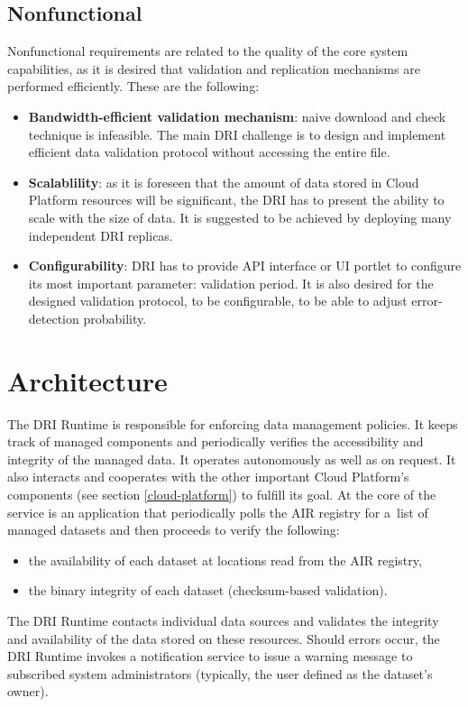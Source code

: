		\subsection{Nonfunctional}
Nonfunctional requirements are related to the quality of the core system
capabilities, as it is desired that validation and replication mechanisms are
performed efficiently. These are the following:
\begin{itemize}
	\item \textbf{Bandwidth-efficient validation mechanism}: naive download and
	check technique is infeasible. The main DRI challenge is to design and
	implement efficient data validation protocol without accessing the entire
	file.
	\item \textbf{Scalablility}: as it is foreseen that the amount of data
	stored in Cloud Platform resources will be significant, the DRI has to
	present the ability to scale with the size of data. It is suggested to be
	achieved by deploying many independent DRI replicas. 
	\item \textbf{Configurability}: DRI has to provide API interface or UI
	portlet to configure its most important parameter: validation period. It is
	also desired for the designed validation protocol, to be configurable, to
	be able to adjust error-detection probability.
\end{itemize}
	\section{Architecture}
The DRI Runtime is responsible for enforcing data management policies. It keeps
track of managed components and periodically verifies the accessibility and
integrity of the managed data. It operates autonomously as well as on request.
It also interacts and cooperates with the other important Cloud Platform's
components (see section \ref{cloud-platform}) to fulfill its goal. At the core
of the service is an application that periodically polls the AIR registry for
a~list of managed datasets and then proceeds to verify the following:

\begin{itemize}
	\item the availability of each dataset at locations read from the AIR
	registry,
	\item the binary integrity of each dataset (checksum-based validation).
\end{itemize}

The DRI Runtime contacts individual data sources and validates the integrity
and availability of the data stored on these resources. Should errors occur,
the DRI Runtime invokes a notification service to issue a warning message
to subscribed system administrators (typically, the user defined as the 
dataset's owner).\\

